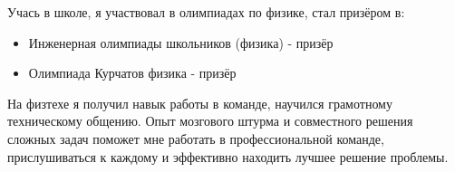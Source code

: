 \documentclass[letterpaper,11pt]{article}
\newcommand{\resumeItem}[1]{
  \item\small{
    {#1 \vspace{-2pt}}
  }
}
\newcommand{\resumeItemListStart}{\begin{itemize}}
\newcommand{\resumeItemListEnd}{\end{itemize}\vspace{-5pt}}
\begin{document}
\hspace{1cm}Учась в школе, я участвовал в олимпиадах по физике, стал призёром в:
\vspace*{-2.5mm}
    \resumeItemListStart
        \resumeItem{Инженерная олимпиады школьников (физика) - призёр}
\vspace*{-2.5mm}
        \resumeItem{Олимпиада Курчатов физика - призёр}
    \resumeItemListEnd
    
\newline



\hspace{1cm}На физтехе я получил навык работы в команде, научился грамотному техническому общению. Опыт мозгового штурма и совместного решения сложных задач поможет мне работать в профессиональной команде, прислушиваться к каждому и
эффективно находить лучшее решение проблемы. 



\end{document}
